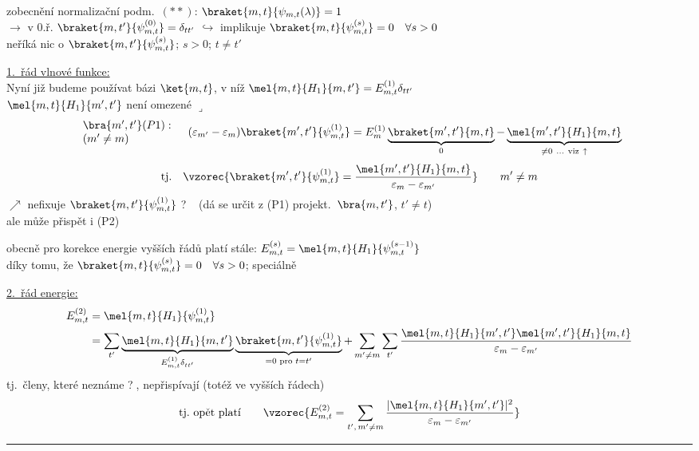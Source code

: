 zobecnění normalizační podm.\ $(**)$: \quad $\braket{m,t}{\psi_{m,t}(\lambda)} = 1$ \\
\quad $\to$ v 0.ř. \quad $\braket{m,t'}{\psi_{m,t}^{(0)}} = \delta_{tt'}$ \qquad
$\hookrightarrow$ implikuje $\braket{m,t}{\psi_{m,t}^{(s)}} = 0 \quad \forall s > 0$ \\
\hspace*{6.3cm} neříká nic o $\braket{m,t'}{\psi_{m,t}^{(s)}}$; $s > 0$; $t\neq t'$

\underline{1.\ řád vlnové funkce:} \\
Nyní již budeme používat bázi $\ket{m,t}$, v níž \quad $\mel{m,t}{H_1}{m,t'} = E_{m,t}^{(1)}\delta_{tt'}$ \\
\hspace*{6cm}  $\mel{m,t}{H_1}{m',t'}$ není omezené $\lrcorner$
\[
  \begin{array}{l}\bra{m',t'}(P1):\\ (m'\neq m)\end{array}\quad
  (\varepsilon_{m'} - \varepsilon_m)\braket{m',t'}{\psi_{m,t}^{(1)}} = E_m^{(1)}\underbrace{\braket{m',t'}{m,t}}_{0} - \underbrace{\mel{m',t'}{H_1}{m,t}}_{\neq 0\ \dots\ \text{viz}\ \uparrow}
\]
\[
  \text{tj.}\quad \vzorec{\braket{m',t'}{\psi_{m,t}^{(1)}} = \frac{\mel{m',t'}{H_1}{m,t}}{\varepsilon_m - \varepsilon_{m'}}} \qquad m'\neq m
\]
 $\nearrow$ nefixuje $\braket{m,t'}{\psi_{m,t}^{(1)}}$ \textcircled{?} \ (dá se určit z (P1) projekt.\ $\bra{m,t'}$, $t'\neq t$) \\
\hspace*{5.6cm} ale může přispět i (P2)

obecně pro korekce energie vyšších řádů platí stále: \quad $E_{m,t}^{(s)} = \mel{m,t}{H_1}{\psi_{m,t}^{(s-1)}}$ \\
\quad díky tomu, že $\braket{m,t}{\psi_{m,t}^{(s)}} = 0 \quad \forall s > 0$; speciálně

\underline{2.\ řád energie:} 
\begin{align*}
  E_{m,t}^{(2)} &= \mel{m,t}{H_1}{\psi_{m,t}^{(1)}} \\
  &= \sum_{t'}\underbrace{\mel{m,t}{H_1}{m,t'}}_{E_{m,t}^{(1)}\delta_{tt'}}\underbrace{\braket{m,t'}{\psi_{m,t}^{(1)}}}_{=0\text{ pro } t = t'}
   + \sum_{m'\neq m}\sum_{t'}\frac{\mel{m,t}{H_1}{m',t'}\mel{m',t'}{H_1}{m,t}}{\varepsilon_m - \varepsilon_{m'}}
\end{align*}
\hfill tj.\ členy, které neznáme \textcircled{?}, nepřispívají (totéž ve vyšších řádech)
\[
  \text{tj.\ opět platí}\qquad \vzorec{E_{m,t}^{(2)} = \sum_{t',\,m'\neq m}\frac{|\mel{m,t}{H_1}{m',t'}|^2}{\varepsilon_m - \varepsilon_{m'}}}
\]
\noindent\rule{\linewidth}{0.4pt}

